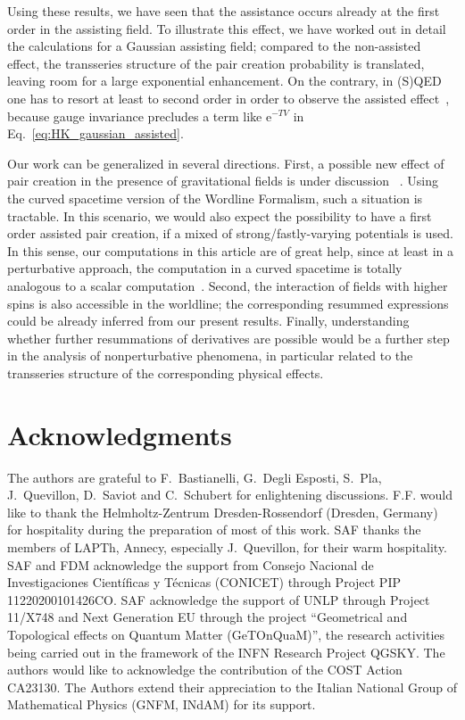 \documentclass[12pt,a4paper]{article}
\numberwithin{equation}{section}
\numberwithin{equation}{section}
\begin{document}
Using these results, we have seen that the assistance occurs already at the first order in the assisting field. To illustrate this effect, we have worked out in detail the calculations for a Gaussian assisting field; compared to the non-assisted effect, the transseries structure of the pair creation probability is translated, leaving room for a large exponential enhancement. On the contrary, in (S)QED one has to resort at least to second order in order to observe the assisted effect~\cite{Torgrimsson:2018xdf}, because gauge invariance precludes a term like $\mathrm{e}^{-TV}$ in Eq.~\eqref{eq:HK_gaussian_assisted}.

Our work can be generalized in several directions. First, a possible new effect of pair creation in the presence of gravitational fields is under discussion~
\cite{Wondrak:2023zdi,Ferreiro:2023jfs,Hertzberg:2023xve,Akhmedov:2024axn, Boasso:2024ryt}. Using the curved spacetime version of the Wordline Formalism, such a situation is tractable.
In this scenario, we would also expect the possibility to have a first order assisted pair creation, if a mixed of strong/fastly-varying potentials is used. In this sense, our computations in this article are of great help, since at least in a perturbative approach, the computation in a curved spacetime is totally analogous to a scalar computation~\cite{vandeVen:1997pf}.
Second, the interaction of fields with higher spins is also accessible in the worldline; the corresponding resummed expressions could be already inferred from our present results.
Finally, understanding whether further resummations of derivatives are possible would be a further step in the analysis of nonperturbative phenomena, in particular related to the transseries structure of the corresponding physical effects.


\section*{Acknowledgments}
The authors are grateful to F.~Bastianelli, G.~Degli Esposti, S.~Pla, J.~Quevillon, D.~Saviot and C.~Schubert for enlightening discussions. F.F. would like to thank the Helmholtz-Zentrum Dresden-Rossendorf (Dresden, Germany) for hospitality during the preparation of most of this work.
SAF thanks the members of LAPTh, Annecy, especially J.~Quevillon, for their warm hospitality. SAF and FDM acknowledge the support from Consejo Nacional de Investigaciones Científicas y Técnicas (CONICET) through Project PIP 11220200101426CO.
SAF acknowledge the support of UNLP through Project 11/X748 and Next Generation EU through
the project ``Geometrical and Topological effects on Quantum Matter (GeTOnQuaM)'', the research activities being carried out in the framework of the INFN Research Project QGSKY. 		The authors would like to acknowledge the contribution of the COST Action CA23130. The Authors extend their appreciation to the Italian National Group of Mathematical Physics (GNFM, INdAM) for its support.
\end{document}
